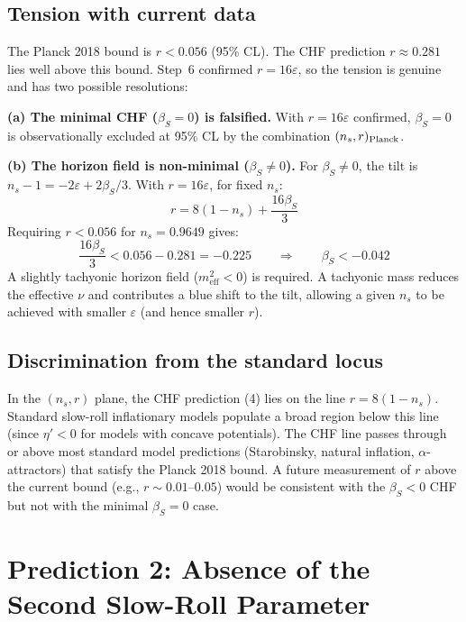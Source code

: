 \documentclass[12pt,a4paper]{article}
\begin{document}
\subsection{Tension with current data}

The Planck 2018 bound is $r < 0.056$ (95\% CL). The CHF prediction $r \approx 0.281$ lies well above this bound. Step~6 confirmed $r = 16\varepsilon$, so the tension is genuine and has two possible resolutions:

\textbf{(a) The minimal CHF ($\beta_S = 0$) is falsified.} With $r = 16\varepsilon$ confirmed, $\beta_S = 0$ is observationally excluded at 95\% CL by the combination $(n_s, r)_{\rm Planck}$.

\textbf{(b) The horizon field is non-minimal ($\beta_S \neq 0$).} For $\beta_S \neq 0$, the tilt is $n_s - 1 = -2\varepsilon + 2\beta_S/3$. With $r = 16\varepsilon$, for fixed $n_s$:
\begin{equation}
r = 8(1 - n_s) + \frac{16\beta_S}{3} \tag{6}
\end{equation}
Requiring $r < 0.056$ for $n_s = 0.9649$ gives:
\begin{equation}
\frac{16\beta_S}{3} < 0.056 - 0.281 = -0.225 \qquad \Longrightarrow \qquad \beta_S < -0.042 \tag{7}
\end{equation}
A slightly tachyonic horizon field ($m_\text{eff}^2 < 0$) is required. A tachyonic mass reduces the effective $\nu$ and contributes a blue shift to the tilt, allowing a given $n_s$ to be achieved with smaller $\varepsilon$ (and hence smaller $r$).

\subsection{Discrimination from the standard locus}

In the $(n_s, r)$ plane, the CHF prediction (4) lies on the line $r = 8(1-n_s)$. Standard slow-roll inflationary models populate a broad region below this line (since $\eta' < 0$ for models with concave potentials). The CHF line passes through or above most standard model predictions (Starobinsky, natural inflation, $\alpha$-attractors) that satisfy the Planck 2018 bound. A future measurement of $r$ above the current bound (e.g., $r \sim 0.01$--$0.05$) would be consistent with the $\beta_S < 0$ CHF but not with the minimal $\beta_S = 0$ case.

\section{Prediction 2: Absence of the Second Slow-Roll Parameter}
\end{document}
